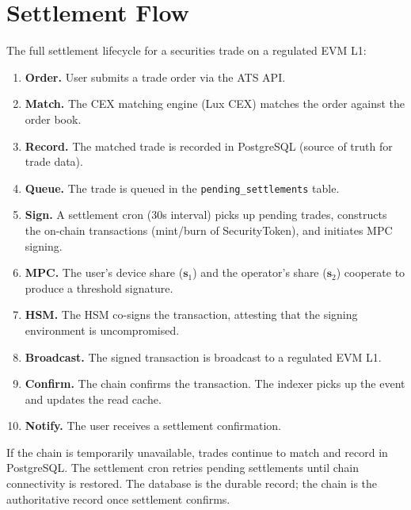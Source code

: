 \section{Settlement Flow}

\label{sec:settlement}

The full settlement lifecycle for a securities trade on a regulated EVM L1:

\begin{enumerate}[nosep]
  \item \textbf{Order.}  User submits a trade order via the ATS API.
  \item \textbf{Match.}  The CEX matching engine (Lux CEX) matches
        the order against the order book.
  \item \textbf{Record.}  The matched trade is recorded in PostgreSQL
        (source of truth for trade data).
  \item \textbf{Queue.}  The trade is queued in the
        \texttt{pending\_settlements} table.
  \item \textbf{Sign.}  A settlement cron (30s interval) picks up
        pending trades, constructs the on-chain transactions
        (mint/burn of SecurityToken), and initiates MPC signing.
  \item \textbf{MPC.}  The user's device share ($\mathbf{s}_1$) and
        the operator's share ($\mathbf{s}_2$) cooperate to produce
        a threshold signature.
  \item \textbf{HSM.}  The HSM co-signs the transaction, attesting
        that the signing environment is uncompromised.
  \item \textbf{Broadcast.}  The signed transaction is broadcast to
        a regulated EVM L1.
  \item \textbf{Confirm.}  The chain confirms the transaction.  The
        indexer picks up the event and updates the read cache.
  \item \textbf{Notify.}  The user receives a settlement confirmation.
\end{enumerate}

If the chain is temporarily unavailable, trades continue to match and
record in PostgreSQL.  The settlement cron retries pending settlements
until chain connectivity is restored.  The database is the durable
record; the chain is the authoritative record once settlement confirms.

